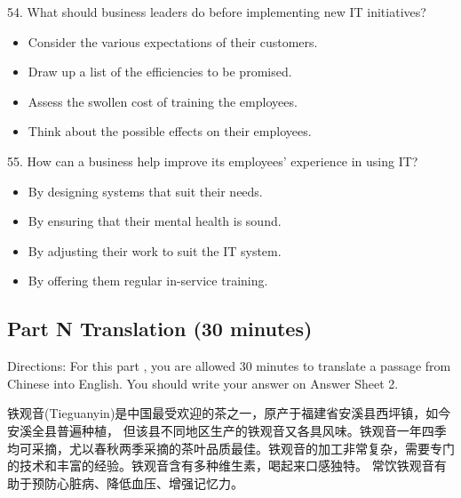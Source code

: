 \documentclass[UTF8,11pt]{ctexart}
\begin{document}
54. What should business leaders do before implementing new IT initiatives?


\begin{itemize}[leftmargin=2em,itemsep=.2em,topsep=.4em]\item[A.] Consider the various expectations of their customers.
\item[B.] Draw up a list of the efficiencies to be promised.
\item[C.] Assess the swollen cost of training the employees.
\item[D.] Think about the possible effects on their employees.
\end{itemize}

55. How can a business help improve its employees' experience in using IT?


\begin{itemize}[leftmargin=2em,itemsep=.2em,topsep=.4em]\item[A.] By designing systems that suit their needs.
\item[B.] By ensuring that their mental health is sound.
\item[C.] By adjusting their work to suit the IT system.
\item[D.] By offering them regular in-service training.
\end{itemize}

\subsection*{Part N Translation (30 minutes)}


Directions: For this part , you are allowed 30 minutes to translate a passage from Chinese into English. You should write your answer on Answer Sheet 2.


铁观音(Tieguanyin)是中国最受欢迎的茶之一，原产于福建省安溪县西坪镇，如今安溪全县普遍种植， 但该县不同地区生产的铁观音又各具风味。铁观音一年四季均可采摘，尤以春秋两季采摘的茶叶品质最佳。铁观音的加工非常复杂，需要专门的技术和丰富的经验。铁观音含有多种维生素，喝起来口感独特。 常饮铁观音有助于预防心脏病、降低血压、增强记忆力。
\end{document}
